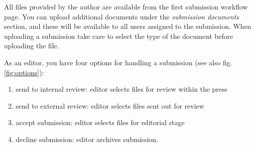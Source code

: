 







All files provided by the author are available from the first submission workflow page. You can upload additional documents under the \textit{submission documents} section, and these will be available to all users assigned to the submission. When uploading a submission take care to select the type of the document before uploading the file. 

As an editor, you have four options for handling a submission (see also fig. \ref{fig:options}): 
\begin{enumerate}[noitemsep]
\item send to internal review: editor selects files for review within the press
\item send to external review: editor selects files sent out for review
\item accept submission: editor selects files for editorial stage
\item decline submission: editor archives submission.
\end{enumerate}

